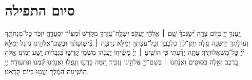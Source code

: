 \documentclass[twoside, openany, parskip=half, 11pt]{book}
\begin{document}
\negline
\kafdalet


\etzchaim




\nextpage

\section[סיום התפילה]{ סיום התפילה }
\label{ashrei}
\ashrei


יַֽעַנְךָ֣ יְיָ֭ בְּי֣וֹם צָרָ֑ה יְ֝שַׂגֶּבְךָ֗ שֵׁ֤ם ׀ אֱלֹהֵ֬י יַעֲקֹֽב׃
יִשְׁלַֽח־עֶזְרְךָ֥ מִקֹּ֑דֶשׁ וּ֝מִצִּיּ֗וֹן יִסְעָדֶֽךָּ׃
יִזְכֹּ֥ר כׇּל־מִנְחֹתֶ֑ךָ וְעוֹלָתְךָ֖ יְדַשְּׁנֶ֣ה סֶֽלָה׃
יִֽתֶּן־לְךָ֥ כִלְבָבֶ֑ךָ וְֽכׇל־עֲצָתְךָ֥ יְמַלֵּֽא׃
נְרַנְּנָ֤ה ׀ בִּ֘ישׁ֤וּעָתֶ֗ךָ וּבְשֵֽׁם־אֱלֹהֵ֥ינוּ נִדְגֹּ֑ל יְמַלֵּ֥א יְ֝יָ֗ כׇּל־מִשְׁאֲלוֹתֶֽיךָ׃
עַתָּ֤ה יָדַ֗עְתִּי כִּ֤י הוֹשִׁ֥יעַ ׀ יְיָ֗ מְשִׁ֫יח֥וֹ יַ֭עֲנֵהוּ מִשְּׁמֵ֣י קׇדְשׁ֑וֹ בִּ֝גְבֻר֗וֹת יֵ֣שַׁע יְמִינֽוֹ׃
אֵ֣לֶּה בָ֭רֶכֶב וְאֵ֣לֶּה בַסּוּסִ֑ים וַאֲנַ֓חְנוּ ׀ בְּשֵׁם־יְיָ֖ אֱלֹהֵ֣ינוּ נַזְכִּֽיר׃
הֵ֭מָּה כָּרְע֣וּ וְנָפָ֑לוּ וַאֲנַ֥חְנוּ קַּ֝֗מְנוּ וַנִּתְעוֹדָֽד׃
יְיָ֥ הוֹשִׁ֑יעָה הַ֝מֶּ֗לֶךְ יַעֲנֵ֥נוּ בְיוֹם־קׇרְאֵֽנוּ׃
\end{document}
